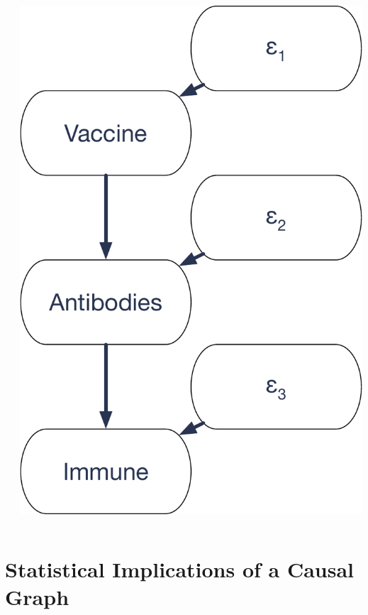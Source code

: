 \documentclass[12pt, block=fill]{beamer}
\begin{document}
\begin{frame}
\begin{columns}
\begin{column}{0.6\textwidth}
    \end{column}
    \begin{column}{0.4\textwidth}
      \includegraphics[width=\textwidth]{images/vaccine_graph}
    \end{column}
  \end{columns}
\end{frame}

\section{Statistical Implications of a Causal Graph}
\end{document}
